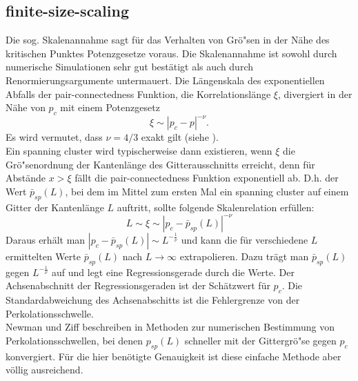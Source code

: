 \subsection{finite-size-scaling}
\label{sec:finitesize}
Die sog. Skalenannahme sagt f\"ur das Verhalten von Gr\"o"sen in der N\"ahe des kritischen Punktes Potenzgesetze voraus. Die Skalenannahme ist sowohl durch numerische Simulationen sehr gut best\"atigt als auch durch Renormierungsargumente untermauert. Die L\"angenskala des exponentiellen Abfalls der pair-connectedness Funktion, die Korrelationsl\"ange $\xi$, divergiert in der N\"ahe von $p_c$ mit einem Potenzgesetz
\begin{equation}
  \xi \sim |p_c-p|^{-\nu}.
\end{equation}
Es wird vermutet, dass $\nu=4/3$ exakt gilt (siehe \cite{Stauffer:95}). \\
Ein spanning cluster wird typischerweise dann existieren, wenn $\xi$ die Gr\"o"senordnung der Kantenl\"ange des Gitterausschnitts erreicht, denn f\"ur Abst\"ande $x>\xi$ f\"allt die pair-connectedness Funktion exponentiell ab. D.h. der Wert $\bar{p}_{sp}(L)$, bei dem im Mittel zum ersten Mal ein spanning cluster auf einem Gitter der Kantenl\"ange $L$ auftritt, sollte folgende Skalenrelation erf\"ullen:
\begin{equation}
  L \sim \xi \sim |p_c-\bar{p}_{sp}(L)|^{-\nu}
\end{equation}
Daraus erh\"alt man $|p_c-\bar{p}_{sp}(L)| \sim L^{-\frac{1}{\nu}}$ und kann die f\"ur verschiedene $L$ ermittelten Werte $\bar{p}_{sp}(L)$ nach $L\rightarrow \infty$ extrapolieren. Dazu tr\"agt man $\bar{p}_{sp}(L)$ gegen $L^{-\frac{1}{\nu}}$ auf und legt eine Regressionsgerade durch die Werte. Der Achsenabschnitt der Regressionsgeraden ist der Sch\"atzwert f\"ur $p_c$.  Die Standardabweichung des Achsenabschitts ist die Fehlergrenze von der Perkolationsschwelle.
\\Newman und Ziff beschreiben in \cite{Newman:01} Methoden zur numerischen Bestimmung von Perkolationsschwellen, bei denen $p_{sp}(L)$ schneller mit der Gittergr\"o"se gegen $p_c$ konvergiert. F\"ur die hier ben\"otigte Genauigkeit ist diese einfache Methode aber v\"ollig ausreichend.
 
